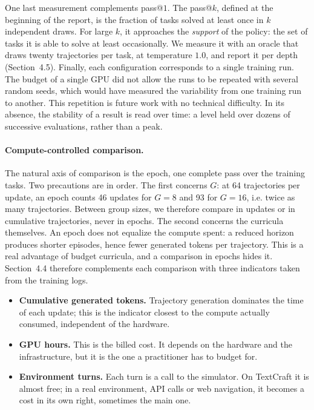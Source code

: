 \documentclass[11pt,a4paper]{article}
\begin{document}
One last measurement complements pass@$1$. The pass@$k$, defined at the beginning of the report, is the fraction of tasks solved at least once in $k$ independent draws. For large $k$, it approaches the \emph{support} of the policy: the set of tasks it is able to solve at least occasionally. We measure it with an oracle that draws twenty trajectories per task, at temperature $1.0$, and report it per depth (Section~4.5). Finally, each configuration corresponds to a single training run. The budget of a single GPU did not allow the runs to be repeated with several random seeds, which would have measured the variability from one training run to another. This repetition is future work with no technical difficulty. In its absence, the stability of a result is read over time: a level held over dozens of successive evaluations, rather than a peak.

\paragraph{Compute-controlled comparison.} The natural axis of comparison is the epoch, one complete pass over the training tasks. Two precautions are in order. The first concerns $G$: at 64 trajectories per update, an epoch counts 46 updates for $G=8$ and 93 for $G=16$, i.e. twice as many trajectories. Between group sizes, we therefore compare in updates or in cumulative trajectories, never in epochs. The second concerns the curricula themselves. An epoch does not equalize the compute spent: a reduced horizon produces shorter episodes, hence fewer generated tokens per trajectory. This is a real advantage of budget curricula, and a comparison in epochs hides it. Section~4.4 therefore complements each comparison with three indicators taken from the training logs.

\begin{itemize}
    \item \textbf{Cumulative generated tokens.} Trajectory generation dominates the time of each update; this is the indicator closest to the compute actually consumed, independent of the hardware.
    \item \textbf{GPU hours.} This is the billed cost. It depends on the hardware and the infrastructure, but it is the one a practitioner has to budget for.
    \item \textbf{Environment turns.} Each turn is a call to the simulator. On TextCraft it is almost free; in a real environment, API calls or web navigation, it becomes a cost in its own right, sometimes the main one.
\end{itemize}
\end{document}
